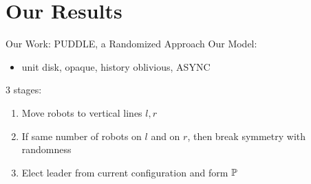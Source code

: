 \documentclass{beamer}
\begin{document}
\section{Our Results} 
\begin{frame}{Our Work: PUDDLE, a Randomized Approach}
	Our Model:
	\begin{itemize}
		\item unit disk, opaque, history oblivious, ASYNC
	\end{itemize}
	3 stages:
	\begin{enumerate}
		\item Move robots to vertical lines $l,r$
		\item If same number of robots on $l$ and on $r$, then break symmetry with randomness
		\item Elect leader from current configuration and form $\mathbb{P}$
	\end{enumerate}
\end{frame}
\end{document}
